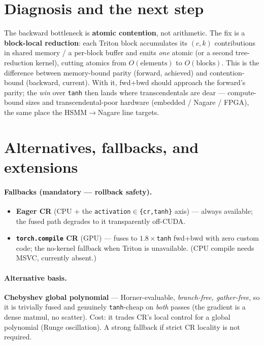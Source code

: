 \documentclass[11pt]{article}
\newcommand{\code}[1]{\texttt{\small #1}}
\begin{document}
\section{Diagnosis and the next step}
The backward bottleneck is \textbf{atomic contention}, not arithmetic. The fix is a \textbf{block-local
reduction}: each Triton block accumulates its $(c,k)$ contributions in shared memory / a per-block buffer and
emits \emph{one} atomic (or a second tree-reduction kernel), cutting atomics from $O(\text{elements})$ to
$O(\text{blocks})$. This is the difference between memory-bound parity (forward, achieved) and contention-bound
(backward, current). With it, fwd+bwd should approach the forward's parity; the \emph{win} over \code{tanh}
then lands where transcendentals are dear --- compute-bound sizes and transcendental-poor hardware (embedded /
Nagare / FPGA), the same place the HSMM$\to$Nagare line targets.

\section{Alternatives, fallbacks, and extensions}
\paragraph{Fallbacks (mandatory --- rollback safety).}
\begin{itemize}[nosep]
  \item \textbf{Eager CR} (CPU + the \code{activation$\in$\{cr,tanh\}} axis) --- always available; the fused
        path degrades to it transparently off-CUDA.
  \item \textbf{\code{torch.compile} CR} (GPU) --- fuses to $1.8\times$\code{tanh} fwd+bwd with zero custom
        code; the no-kernel fallback when Triton is unavailable. (CPU compile needs MSVC, currently absent.)
\end{itemize}
\paragraph{Alternative basis.} \textbf{Chebyshev global polynomial} --- Horner-evaluable, \emph{branch-free,
gather-free}, so it is trivially fused and genuinely \code{tanh}-cheap on \emph{both} passes (the gradient is a
dense matmul, no scatter). Cost: it trades CR's local control for a global polynomial (Runge oscillation).
A strong fallback if strict CR locality is not required.
\end{document}
